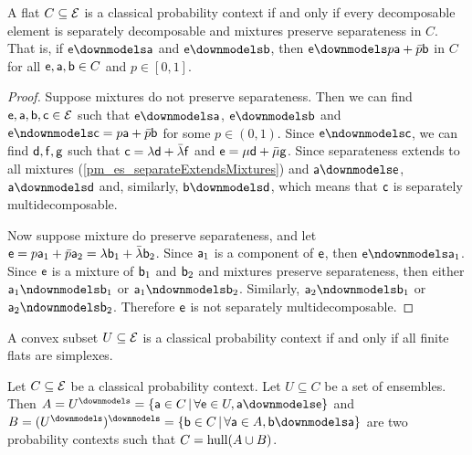 \begin{mathSection}
	\begin{prop}
		A flat $C \subseteq \Ens$ is a classical probability context if and only if every decomposable element is separately decomposable and mixtures preserve separateness in $C$. That is, if $\ens \separate \ens[a]$ and $\ens \separate \ens[b]$, then $\ens \separate p\ens[a] + \bar{p} \ens[b]$ in $C$ for all $\ens, \ens[a], \ens[b] \in C$ and $p \in [0,1]$.
	\end{prop}
	
	\begin{proof}
		Suppose mixtures do not preserve separateness. Then we can find $\ens,\ens[a],\ens[b], \ens[c] \in \Ens$ such that $\ens \separate \ens[a]$, $\ens \separate \ens[b]$ and $\ens \nseparate \ens[c] = p \ens[a] + \bar{p} \ens[b]$ for some $p \in (0,1)$. Since $\ens \nseparate \ens[c]$, we can find $\ens[d], \ens[f], \ens[g]$ such that $\ens[c] = \lambda \ens[d] + \bar{\lambda} \ens[f]$ and $\ens = \mu \ens[d] + \bar{\mu} \ens[g]$.  Since separateness extends to all mixtures (\ref{pm_es_separateExtendsMixtures}) and $\ens[a] \separate \ens[e]$, $\ens[a] \separate \ens[d]$ and, similarly, $\ens[b] \separate \ens[d]$, which means that $\ens[c]$ is separately multidecomposable.
		
		Now suppose mixture do preserve separateness, and let $\ens = p \ens[a]_1 + \bar{p} \ens[a]_2 = \lambda \ens[b]_1 +\bar{\lambda} \ens[b]_2$. Since $\ens[a]_1$ is a component of $\ens$, then $\ens \nseparate \ens[a]_1$. Since $\ens$ is a mixture of $\ens[b]_1$ and $\ens[b]_2$ and mixtures preserve separateness, then either $\ens[a]_1 \nseparate \ens[b]_1$ or $\ens[a]_1 \nseparate \ens[b]_2$. Similarly, $\ens[a]_2 \nseparate \ens[b]_1$ or $\ens[a]_2 \nseparate \ens[b]_2$. Therefore $\ens$ is not separately multidecomposable.
	\end{proof}
	
	\begin{conj}
		A convex subset $U \subseteq \Ens$ is a classical probability context if and only if all finite flats are simplexes.
	\end{conj}
	
	\begin{prop}
		Let $C \subseteq \Ens$ be a classical probability context. Let $U \subseteq C$ be a set of ensembles. Then $A=U^\separate=\{ \ens[a] \in C \, | \, \forall \ens \in U, \ens[a] \separate \ens \}$ and $B=(U^\separate)^\separate=\{ \ens[b] \in C \, | \, \forall \ens[a] \in A, \ens[b] \separate \ens[a] \}$ are two probability contexts such that $C = \hull(A \cup B)$.
	\end{prop}
	

\end{mathSection}
